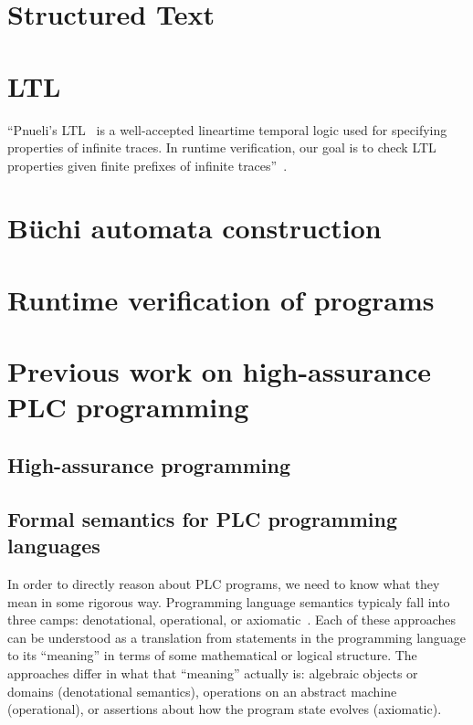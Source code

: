 \section{Structured Text}

\section{LTL}

``Pnueli’s LTL~\cite{pnueli:ltl} is a well-accepted lineartime temporal logic
used for specifying properties of infinite traces. In runtime verification, our
goal is to check LTL properties given finite prefixes of infinite
traces''~\cite{bauer:rv_ltl}.

\section{B\"uchi automata construction}

\section{Runtime verification of programs}

\section{Previous work on high-assurance PLC programming}

\subsection{High-assurance programming}

\subsection{Formal semantics for PLC programming languages}

In order to directly reason about PLC programs, we need to know what they mean
in some rigorous way. Programming language semantics typicaly fall into three
camps: denotational, operational, or axiomatic~\cite{hoare:axiomatic}. Each of
these approaches can be understood as a translation from statements in the
programming language to its ``meaning'' in terms of some mathematical or logical
structure. The approaches differ in what that ``meaning'' actually is: algebraic
objects or domains (denotational semantics), operations on an abstract machine
(operational), or assertions about how the program state evolves (axiomatic).

